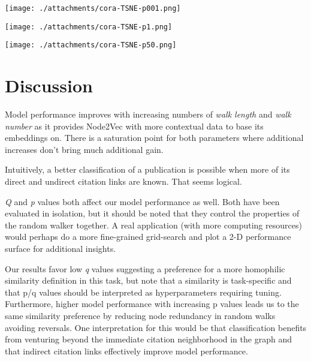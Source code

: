 \documentclass[a4paper,10pt]{article}
\begin{document}
\begin{minipage}[c][20em][b]{0.35\textwidth}
  \texttt{[image: ./attachments/cora-TSNE-p001.png]}
  \label{fig:TSNE:0.01}
\end{minipage}
\hfill
\begin{minipage}[c][20em][b]{0.31\textwidth}
  \texttt{[image: ./attachments/cora-TSNE-p1.png]}
  \label{fig:TSNE:1.0}
\end{minipage}
\hfill
\begin{minipage}[c][20em][b]{0.32\textwidth}
  \texttt{[image: ./attachments/cora-TSNE-p50.png]}
  \label{fig:TSNE:50.0}
\end{minipage}

\section{Discussion}

Model performance improves with increasing numbers of \textit{walk length} and \textit{walk number} as it provides Node2Vec with more contextual data to base its embeddings on. There is a saturation point for both parameters where additional increases don't bring much additional gain.

Intuitively, a better classification of a publication is possible when more of its direct and undirect citation links are known. That seems logical.

\textit{Q} and \textit{p} values both affect our model performance as well. Both have been evaluated in isolation, but it should be noted that they control the properties of the random walker together. A real application (with more computing resources) would perhaps do a more fine-grained grid-search and plot a 2-D performance surface for additional insights.

Our results favor low \textit{q} values suggesting a preference for a more homophilic similarity definition in this task, but note that a similarity is task-specific and that p/q values should be interpreted as hyperparameters requiring tuning. Furthermore, higher model performance with increasing p values leads us to the same similarity preference by reducing node redundancy in random walks avoiding reversals. One interpretation for this would be that classification benefits from venturing beyond the immediate citation neighborhood in the graph and that indirect citation links effectively improve model performance.
\end{document}

